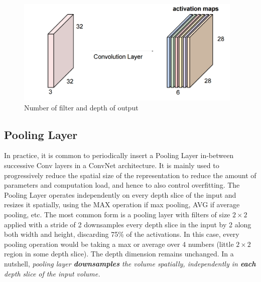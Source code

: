\documentclass[twoside]{article}
\begin{document}
\begin{figure}[!htb]
\centering
\includegraphics[height = 2in]{pics/cnn2.png}
\caption{Number of filter and depth of output\cite{cs231n-website}}
\label{fig:conv_demo2}
\end{figure}
\subsection{Pooling Layer}
In practice, it is common to periodically insert a Pooling Layer in-between successive Conv layers in a ConvNet architecture. It is mainly used to progressively reduce the spatial size of the representation to reduce the amount of parameters and computation load, and hence to also control overfitting. The Pooling Layer operates independently on every depth slice of the input and resizes it spatially, using the MAX operation if max pooling, AVG if average pooling, etc. The most common form is a pooling layer with filters of size $2\times2$ applied with a stride of 2 downsamples every depth slice in the input by 2 along both width and height, discarding 75\% of the activations. In this case, every pooling operation would be taking a max or average over 4 numbers (little $2\times2$ region in some depth slice). The depth dimension remains unchanged. In a nutshell, \textit{pooling layer \textbf{downsamples} the volume spatially, independently in \textbf{each} depth slice of the input volume.}
\end{document}
